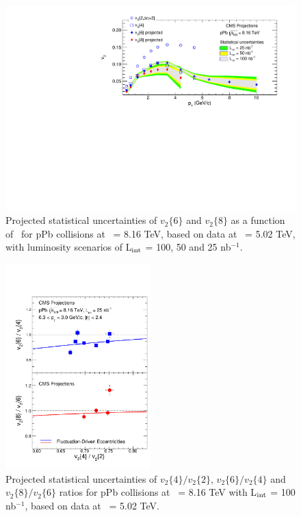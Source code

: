 \begin{figure}[thb]
  \begin{center}
    \includegraphics[width=\textwidth]{figures/vnpT_proj_100nb_combineLumi.pdf}
    \caption{ Projected statistical uncertainties of $v_2\{6\}$ and $v_2\{8\}$ as a function of \pt\ 
    for pPb collisions at \rootsNN\ = 8.16 TeV, based on data at \rootsNN\ = 5.02 TeV, with luminosity
    scenarios of L$_{\rm int}$ = 100, 50 and 25 nb$^{-1}$.
    }
    \label{fig:vnpT}
  \end{center}
\end{figure}

\begin{figure}[thb]
  \begin{center}
    \includegraphics[width=0.5\textwidth]{figures/vnRatios_proj_100nb.pdf}
    \caption{ Projected statistical uncertainties of $v_2\{4\}/v_2\{2\}$, $v_2\{6\}/v_2\{4\}$ and $v_2\{8\}/v_2\{6\}$ ratios
    for pPb collisions at \rootsNN\ = 8.16 TeV with L$_{\rm int}$ = 100 nb$^{-1}$, based on data at \rootsNN\ = 5.02 TeV.
    }
    \label{fig:vnNtrk}
  \end{center}
\end{figure}

\clearpage